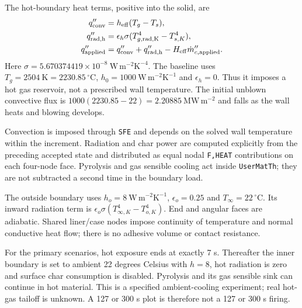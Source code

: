 \documentclass[oneside,openany]{amsdtx}
\begin{document}
The hot-boundary heat terms, positive into the solid, are
\begin{align}
 q_{\rm conv}''&=h_{\rm eff}(T_g-T_s),\\
 q_{\rm rad,h}''&=\epsilon_h\sigma(T_{g,\rm rad,K}^4-T_{s,K}^4),\\
 q_{\rm applied}''&=q_{\rm conv}''+q_{\rm rad,h}''-H_{\rm eff}\dot m_{c,\rm applied}''.
\end{align}
Here $\sigma=5.670374419\times10^{-8}\ \mathrm{W\,m^{-2}K^{-4}}$. The baseline uses $T_g=2504\ \mathrm K=2230.85\,^{\circ}\mathrm C$, $h_0=1000\ \mathrm{W\,m^{-2}K^{-1}}$ and $\epsilon_h=0$. Thus it imposes a hot gas reservoir, not a prescribed wall temperature. The initial unblown convective flux is $1000(2230.85-22)=2.20885\ \mathrm{MW\,m^{-2}}$ and falls as the wall heats and blowing develops.

Convection is imposed through \texttt{SFE} and depends on the solved wall temperature within the increment. Radiation and char power are computed explicitly from the preceding accepted state and distributed as equal nodal \texttt{F,HEAT} contributions on each four-node face. Pyrolysis and gas sensible cooling act inside \texttt{UserMatTh}; they are not subtracted a second time in the boundary load.

The outside boundary uses $h_o=8\ \mathrm{W\,m^{-2}K^{-1}}$, $\epsilon_o=0.25$ and $T_\infty=22\,^{\circ}\mathrm C$. Its inward radiation term is $\epsilon_o\sigma(T_{\infty,K}^4-T_{o,K}^4)$. End and angular faces are adiabatic. Shared liner/case nodes impose continuity of temperature and normal conductive heat flow; there is no adhesive volume or contact resistance.

For the primary scenarios, hot exposure ends at exactly 7 s. Thereafter the inner boundary is set to ambient 22 degrees Celsius with $h=8$, hot radiation is zero and surface char consumption is disabled. Pyrolysis and its gas sensible sink can continue in hot material. This is a specified ambient-cooling experiment; real hot-gas tailoff is unknown. A 127 or 300 s plot is therefore not a 127 or 300 s firing.
\end{document}
